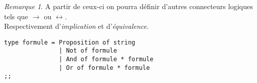 \documentclass{article}
\theoremstyle{definition}
\theoremstyle{remark}
\newtheorem*{remark}{Remarque}
\begin{document}
\begin{remark}
A partir de ceux-ci on pourra définir d'autres connecteurs logiques tels que $\rightarrow$ ou $\leftrightarrow$.\\
Respectivement d'\emph{implication} et d'\emph{équivalence}.
\end{remark}


\begin{verbatim}
type formule = Proposition of string 
               | Not of formule
               | And of formule * formule 
               | Or of formule * formule
;;
\end{verbatim}
\end{document}
